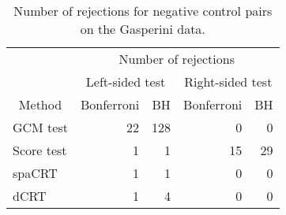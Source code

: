 \begin{table}[!h]
\centering
\caption{\label{tab:real_data_rejection}Number of rejections for negative control pairs on the Gasperini data.}
\centering
\begin{tabular}[t]{lrrrr}
\toprule
\multicolumn{1}{c}{ } & \multicolumn{4}{c}{Number of rejections} \\
\cmidrule(l{3pt}r{3pt}){2-5}
\multicolumn{1}{c}{ } & \multicolumn{2}{c}{Left-sided test} & \multicolumn{2}{c}{Right-sided test} \\
\cmidrule(l{3pt}r{3pt}){2-3} \cmidrule(l{3pt}r{3pt}){4-5}
\multicolumn{1}{c}{Method} & \multicolumn{1}{c}{Bonferroni} & \multicolumn{1}{c}{BH} & \multicolumn{1}{c}{Bonferroni} & \multicolumn{1}{c}{BH} \\
\cmidrule(l{3pt}r{3pt}){1-1} \cmidrule(l{3pt}r{3pt}){2-2} \cmidrule(l{3pt}r{3pt}){3-3} \cmidrule(l{3pt}r{3pt}){4-4} \cmidrule(l{3pt}r{3pt}){5-5}
GCM test & 22 & 128 & 0 & 0\\
Score test & 1 & 1 & 15 & 29\\
spaCRT & 1 & 1 & 0 & 0\\
dCRT & 1 & 4 & 0 & 0\\
\bottomrule
\end{tabular}
\end{table}
